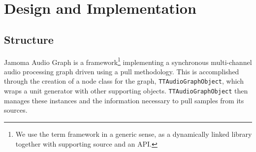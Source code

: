 \documentclass[twoside,a4paper]{article}
\begin{document}

%
\section{Design and Implementation} %
%

\subsection{Structure} %

Jamoma Audio Graph is a framework\footnote{We use the term framework in a generic sense, as a dynamically linked library together with supporting source and an API.} implementing a synchronous multi-channel audio processing graph driven using a pull methodology.
This is accomplished through the creation of a node class for the graph, \texttt{TTAudioGraphObject}, which wraps a unit generator with other supporting objects.  
\texttt{TTAudioGraphObject} then manages these instances and the information necessary to pull samples from its sources. 
\end{document}
